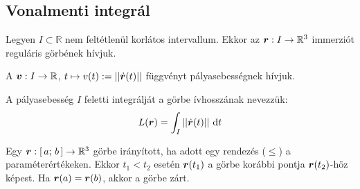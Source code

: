 \documentclass[main.tex]{subfiles}
\begin{document}
\pagebreak
{}
\pagebreak

\subsection{Vonalmenti integrál}


Legyen $I \subset \mathbb{R}$ nem feltétlenül korlátos intervallum.
Ekkor az $\boldsymbol{r} : I \rightarrow \mathbb{R}^3$ immerziót
reguláris görbének hívjuk.




A $\boldsymbol{v} : I \rightarrow \mathbb{R}$,
$t \mapsto v(t) := \left|\left| \dot{\boldsymbol{r}}(t) \right|\right|$
függvényt pályasebességnek hívjuk.




A pályasebesség $I$ feletti integrálját a
görbe ívhosszának nevezzük:
\begin{equation*}
  L(\rvec{r}) = \int_I \norma{\dot{\rvec{r}}(t)} \, \differential t
\end{equation*}




Egy $\boldsymbol{r} : [ \, a; \, b \,] \rightarrow \mathbb{R}^3$ görbe
irányított, ha adott egy rendezés ($\leq$) a paraméterértékeken.
Ekkor $t_1 < t_2$ esetén $\boldsymbol{r}(t_1)$ a görbe korábbi
pontja $\boldsymbol{r}(t_2)$-höz képest. Ha $\boldsymbol{r}(a) = \boldsymbol{r}(b)$,
akkor a görbe zárt.



\end{document}

